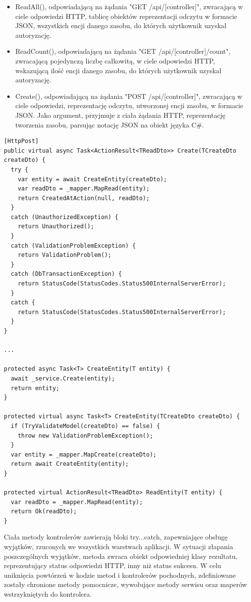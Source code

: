 \begin{itemize}
    \item ReadAll(), odpowiadającą na żądania "GET /api/[controller]", zwracającą w ciele odpowiedzi HTTP, tablicę obiektów reprezentacji odczytu w formacie JSON, wszystkich encji danego zasobu, do których użytkownik uzyskał autoryzację.
    \item ReadCount(), odpowiadającą na żądania "GET /api/[controller]/count", zwracającą pojedynczą liczbę całkowitą, w ciele odpowiedzi HTTP, wskazującą ilość encji danego zasobu, do których użytkownik uzyskał autoryzację.
    \item Create(), odpowiadającą na żądania "POST /api/[controller]", zwracającą w ciele odpowiedzi, reprezentację odczytu, utworzonej encji zasobu, w formacie JSON. Jako argument, przyjmuje z ciała żądania HTTP, reprezentację tworzenia zasobu, parsując notację JSON na obiekt języka C\#.
\end{itemize}

\begin{lstlisting}[language=CSharp, caption={Przykładowe ciało metody obsługującej żądanie oraz metody pomocnicze klasy generycznej kontrolera}, label=lst:controller_example_method]
[HttpPost]
public virtual async Task<ActionResult<TReadDto>> Create(TCreateDto createDto) {
  try {
    var entity = await CreateEntity(createDto);
    var readDto = _mapper.MapRead(entity);
    return CreatedAtAction(null, readDto);
  }
  catch (UnauthorizedException) {
    return Unauthorized();
  }
  catch (ValidationProblemException) {
    return ValidationProblem();
  }
  catch (DbTransactionException) {
    return StatusCode(StatusCodes.Status500InternalServerError);
  }
  catch {
    return StatusCode(StatusCodes.Status500InternalServerError);
  }
}

...

protected async Task<T> CreateEntity(T entity) {
  await _service.Create(entity);
  return entity;
}

protected virtual async Task<T> CreateEntity(TCreateDto createDto) {
  if (TryValidateModel(createDto) == false) {
    throw new ValidationProblemException();
  }
  var entity = _mapper.MapCreate(createDto);
  return await CreateEntity(entity);
}

protected virtual ActionResult<TReadDto> ReadEntity(T entity) {
  var readDto = _mapper.MapRead(entity);
  return Ok(readDto);
}
\end{lstlisting}

Ciała metody kontrolerów zawierają bloki try...catch, zapewniające obsługę wyjątków, rzuconych we wszystkich warstwach aplikacji. W sytuacji złapania poszczególnych wyjątków, metoda zwraca obiekt odpowiedniej klasy rezultatu, reprezentujący status odpowiedzi HTTP, inny niż status sukcesu. W celu uniknięcia powtórzeń w kodzie metod i kontrolerów pochodnych, zdefiniowane zostały chronione metody pomocnicze, wywołujące metody serwisu oraz maperów wstrzykniętych do kontrolera.

